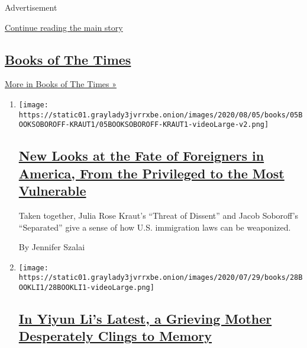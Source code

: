 Advertisement

\protect\hyperlink{after-mid1}{Continue reading the main story}

\hypertarget{books-of-the-times-3}{%
\subsection{\texorpdfstring{\href{/column/books-of-the-times}{Books of
The Times}}{Books of The Times}}\label{books-of-the-times-3}}

\href{/column/books-of-the-times}{More in Books of The Times »}

\begin{enumerate}
\def\labelenumi{\arabic{enumi}.}
\item
  \texttt{[image: https://static01.graylady3jvrrxbe.onion/images/2020/08/05/books/05BOOKSOBOROFF-KRAUT1/05BOOKSOBOROFF-KRAUT1-videoLarge-v2.png]}

  \hypertarget{new-looks-at-the-fate-of-foreigners-in-america-from-the-privileged-to-the-most-vulnerable}{%
  \subsection{\texorpdfstring{\href{/2020/07/30/books/review-threat-dissent-julia-rose-kraut-separated-jacob-soboroff.html}{New
  Looks at the Fate of Foreigners in America, From the Privileged to the
  Most
  Vulnerable}}{New Looks at the Fate of Foreigners in America, From the Privileged to the Most Vulnerable}}\label{new-looks-at-the-fate-of-foreigners-in-america-from-the-privileged-to-the-most-vulnerable}}

  Taken together, Julia Rose Kraut's ``Threat of Dissent'' and Jacob
  Soboroff's ``Separated'' give a sense of how U.S. immigration laws can
  be weaponized.

  By Jennifer Szalai
\item
  \texttt{[image: https://static01.graylady3jvrrxbe.onion/images/2020/07/29/books/28BOOKLI1/28BOOKLI1-videoLarge.png]}

  \hypertarget{in-yiyun-lis-latest-a-grieving-mother-desperately-clings-to-memory}{%
  \subsection{\texorpdfstring{\href{/2020/07/28/books/review-must-i-go-yiyun-li.html}{In
  Yiyun Li's Latest, a Grieving Mother Desperately Clings to
  Memory}}{In Yiyun Li's Latest, a Grieving Mother Desperately Clings to Memory}}\label{in-yiyun-lis-latest-a-grieving-mother-desperately-clings-to-memory}}


\end{enumerate}
